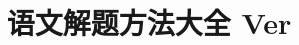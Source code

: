 ﻿\renewcommand{\hatabstractname}{\BB}






\title{语文解题方法大全 Ver \BA}
\author{\BE}
\date{\BF}


\maketitle
\begin{hatabstract}
\BC
\end{hatabstract}







 
